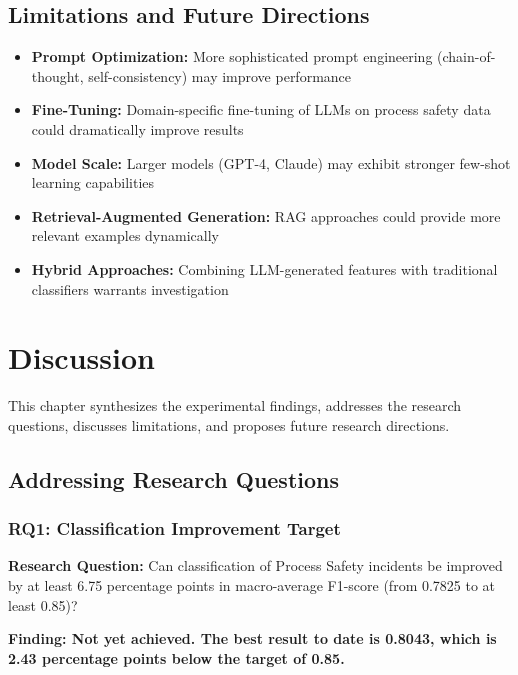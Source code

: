 \documentclass[11pt, titlepage, bibliography=totoc]{scrreprt}
\begin{document}
\section{Limitations and Future Directions}

\begin{itemize}
    \item \textbf{Prompt Optimization:} More sophisticated prompt engineering (chain-of-thought, self-consistency) may improve performance
    \item \textbf{Fine-Tuning:} Domain-specific fine-tuning of LLMs on process safety data could dramatically improve results
    \item \textbf{Model Scale:} Larger models (GPT-4, Claude) may exhibit stronger few-shot learning capabilities
    \item \textbf{Retrieval-Augmented Generation:} RAG approaches could provide more relevant examples dynamically
    \item \textbf{Hybrid Approaches:} Combining LLM-generated features with traditional classifiers warrants investigation
\end{itemize}


\chapter{Discussion}

This chapter synthesizes the experimental findings, addresses the research questions, discusses limitations, and proposes future research directions.

\section{Addressing Research Questions}

\subsection{RQ1: Classification Improvement Target}

\textbf{Research Question:} Can classification of Process Safety incidents be improved by at least 6.75 percentage points in macro-average F1-score (from 0.7825 to at least 0.85)?

\textbf{Finding: Not yet achieved. The best result to date is 0.8043, which is 2.43 percentage points below the target of 0.85.}
\end{document}
